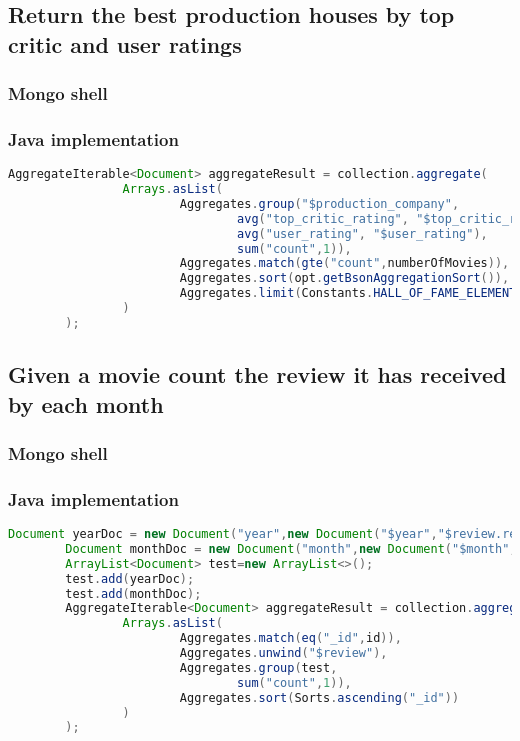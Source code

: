\subsection{Return the best production houses by top critic and user ratings}\label{subsec:productionHouses}
\subsubsection{Mongo shell}

\subsubsection{Java implementation}
\begin{lstlisting}[language=Java]
AggregateIterable<Document> aggregateResult = collection.aggregate(
                Arrays.asList(
                        Aggregates.group("$production_company",
                                avg("top_critic_rating", "$top_critic_rating"),
                                avg("user_rating", "$user_rating"),
                                sum("count",1)),
                        Aggregates.match(gte("count",numberOfMovies)),
                        Aggregates.sort(opt.getBsonAggregationSort()),
                        Aggregates.limit(Constants.HALL_OF_FAME_ELEMENT_NUMBERS)
                )
        );
\end{lstlisting}

\subsection{Given a movie count the review it has received by each month}\label{subsec:reviewByYearMonth}
\subsubsection{Mongo shell}

\subsubsection{Java implementation}
\begin{lstlisting}[language=Java]
Document yearDoc = new Document("year",new Document("$year","$review.review_date"));
        Document monthDoc = new Document("month",new Document("$month","$review.review_date"));
        ArrayList<Document> test=new ArrayList<>();
        test.add(yearDoc);
        test.add(monthDoc);
        AggregateIterable<Document> aggregateResult = collection.aggregate(
                Arrays.asList(
                        Aggregates.match(eq("_id",id)),
                        Aggregates.unwind("$review"),
                        Aggregates.group(test,
                                sum("count",1)),
                        Aggregates.sort(Sorts.ascending("_id"))
                )
        );
\end{lstlisting}


